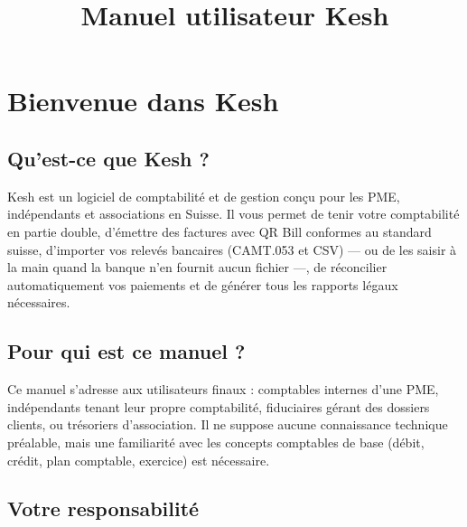 \documentclass[a4paper,11pt,oneside]{article}
\title{Manuel utilisateur Kesh}
\author{\keshAuthor}
\date{\keshReleaseDate}
\begin{document}



\tableofcontents
\clearpage

\section{Bienvenue dans Kesh}

\subsection{Qu'est-ce que Kesh ?}

Kesh est un logiciel de comptabilité et de gestion conçu pour les PME, indépendants et associations en Suisse. Il vous permet de tenir votre comptabilité en partie double, d'émettre des factures avec QR Bill conformes au standard suisse, d'importer vos relevés bancaires (CAMT.053 et CSV) --- ou de les saisir à la main quand la banque n'en fournit aucun fichier ---, de réconcilier automatiquement vos paiements et de générer tous les rapports légaux nécessaires.

\subsection{Pour qui est ce manuel ?}

Ce manuel s'adresse aux utilisateurs finaux : comptables internes d'une PME, indépendants tenant leur propre comptabilité, fiduciaires gérant des dossiers clients, ou trésoriers d'association. Il ne suppose aucune connaissance technique préalable, mais une familiarité avec les concepts comptables de base (débit, crédit, plan comptable, exercice) est nécessaire.

\subsection{Votre responsabilité}\label{sec:responsabilite-utilisateur}
\end{document}
